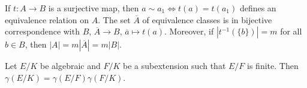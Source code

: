 
If $t\colon A\to B$ is a surjective map, then 
$a\sim a_1\Longleftrightarrow t(a)=t(a_1)$ 
defines an equivalence relation on $A$. The set $\overline{A}$ 
of equivalence classes is in bijective correspondence with $B$,
$\overline{A}\to B$, $\overline{a}\mapsto t(a)$. 
Moreover, if $|t^{-1}(\{b\})|=m$ for all $b\in B$, then 
$|A|=m|\overline{A}|=m|B|$. 

\begin{proposition}
    Let $E/K$ be algebraic and $F/K$ be a subextension such that 
    $E/F$ is finite. Then $\gamma(E/K)=\gamma(E/F)\gamma(F/K)$. 
\end{proposition}

